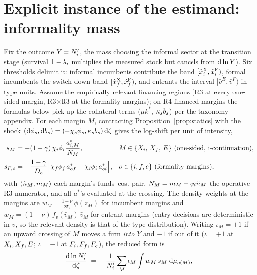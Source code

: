 \documentclass[12pt]{article}
\begin{document}
\section{Explicit instance of the estimand: informality mass}
\label{app:estimand}
Fix the outcome $Y=N'_{i}$, the mass choosing the informal
sector at the transition stage (survival $1-\lambda_{i}$
multiplies the measured stock but cancels from $\mathrm{d}\ln Y$). Six
thresholds delimit it: informal incumbents contribute the band
$[\hat{x}^{\mathrm{X}}_{i},\hat{x}^{\mathrm{F}}_{i})$, formal incumbents the switch-down
band $[\hat{x}^{\mathrm{X}}_{f},\hat{x}^{\mathrm{F}}_{f})$, and entrants the interval
$[\bar v^{E},\bar v^{F})$ in type units. Assume the empirically
relevant financing regions (R3 at every one-sided margin,
R3$\times$R3 at the formality margins); on R4-financed margins the
formulas below pick up the collateral terms
($\mu k^{*}$, $\kappa_{s}b_{s}$) per the taxonomy appendix.
For each margin $M$, contracting Proposition~\ref{prop:statics} with
the shock
$(\mathrm{d}\phi_{s},\mathrm{d}b_{s})
=(-\chi_{s}\phi_{s},\kappa_{s}b_{s})\,\mathrm{d}\zeta$ gives the
log-shift per unit of intensity,
\begin{align*}
  s_{M} &= -(1-\gamma)\,\chi_{i}\phi_{i}\,
    \frac{a^{*}_{i,M}}{N_{M}},
  && M\in\{X_{i},\,X_{f},\,E\}
     \ \text{(one-sided, i-continuation)},\\[2pt]
  s_{F,o} &= -\frac{1-\gamma}{D_{o}}
    \Big[\chi_{f}\phi_{f}\,a^{*}_{of}
    -\chi_{i}\phi_{i}\,a^{*}_{oi}\Big],
  && o\in\{i,f,e\}
     \ \text{(formality margins)},
\end{align*}
with $(\tilde{n}_{M},m_{M})$ each margin's funds--cost pair,
$N_{M}=m_{M}-\phi_{i}\tilde{n}_{M}$ the operative R3
numerator, and all $a^{*}$'s evaluated at the crossing. The density
weights at the margins are
$w_{M}=\frac{1-\nu}{\rho\sigma_{\varepsilon}}\,\phi(z_{M})$ for
incumbent margins and
$w_{M}=(1-\nu)\,f_{v}(\bar v_{M})\,\bar v_{M}$ for entrant margins
(entry decisions are deterministic in $v$, so the relevant density is
that of the type distribution). Writing $\iota_{M}=+1$ if an upward
crossing of $M$ moves a firm \emph{into} $Y$ and $-1$ if out of it
($\iota=+1$ at $X_{i},X_{f},E$; $\iota=-1$ at
$F_{i},F_{f},F_{e}$), the reduced form is
\begin{equation}
  \frac{\mathrm{d}\ln N'_{i}}{\mathrm{d}\zeta}
  \;=\;
  -\frac{1}{N'_{i}}
  \sum_{M}\iota_{M}\int w_{M}\,s_{M}\;\mathrm{d}\mu_{o(M)},
  \label{eq:toy-estimand-num}
\end{equation}
\end{document}
